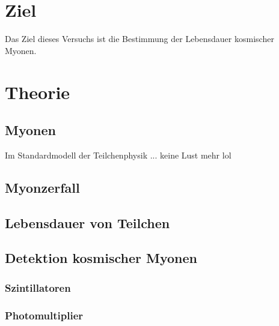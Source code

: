 \section{Ziel}
Das Ziel dieses Versuchs ist die Bestimmung der Lebensdauer kosmischer Myonen.

\section{Theorie}

\subsection{Myonen}
Im Standardmodell der Teilchenphysik ... keine Lust mehr lol

\subsection{Myonzerfall} %


\subsection{Lebensdauer von Teilchen}


\subsection{Detektion kosmischer Myonen}

\subsubsection{Szintillatoren}
\subsubsection{Photomultiplier}